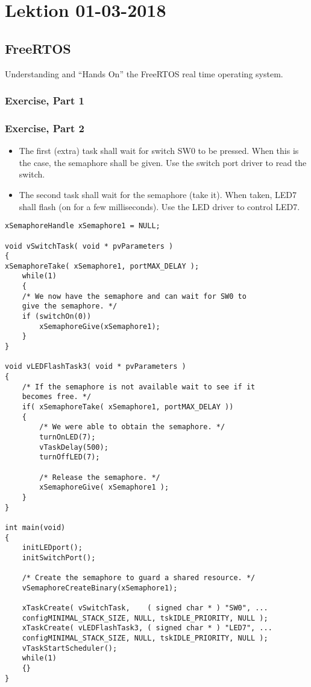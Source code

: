 \section{Lektion 01-03-2018}
\subsection{FreeRTOS}

Understanding and “Hands On” the FreeRTOS real time operating system.
\subsubsection{Exercise, Part 1}

\subsubsection{Exercise, Part 2}
\begin{itemize}
	\item The first (extra) task shall wait for switch SW0 to be pressed.
	When this is the case, the semaphore shall be given.
	Use the switch port driver to read the switch.
	\item The second task shall wait for the semaphore (take it).
	When taken, LED7 shall flash (on for a few milliseconds).
	Use the LED driver to control LED7.
\end{itemize}

\begin{verbatim}
xSemaphoreHandle xSemaphore1 = NULL;

void vSwitchTask( void * pvParameters )
{
xSemaphoreTake( xSemaphore1, portMAX_DELAY );
    while(1)
    {
    /* We now have the semaphore and can wait for SW0 to
    give the semaphore. */
    if (switchOn(0))
        xSemaphoreGive(xSemaphore1);
    }
}

void vLEDFlashTask3( void * pvParameters )
{
    /* If the semaphore is not available wait to see if it
    becomes free. */
    if( xSemaphoreTake( xSemaphore1, portMAX_DELAY ))
    {
        /* We were able to obtain the semaphore. */
        turnOnLED(7);
        vTaskDelay(500);
        turnOffLED(7);

        /* Release the semaphore. */
        xSemaphoreGive( xSemaphore1 );
    }
}

int main(void)
{
    initLEDport();
    initSwitchPort();

    /* Create the semaphore to guard a shared resource. */
    vSemaphoreCreateBinary(xSemaphore1);

    xTaskCreate( vSwitchTask,    ( signed char * ) "SW0", ...
    configMINIMAL_STACK_SIZE, NULL, tskIDLE_PRIORITY, NULL );
    xTaskCreate( vLEDFlashTask3, ( signed char * ) "LED7", ...
    configMINIMAL_STACK_SIZE, NULL, tskIDLE_PRIORITY, NULL );	
    vTaskStartScheduler();
    while(1)
    {}
}
\end{verbatim}

